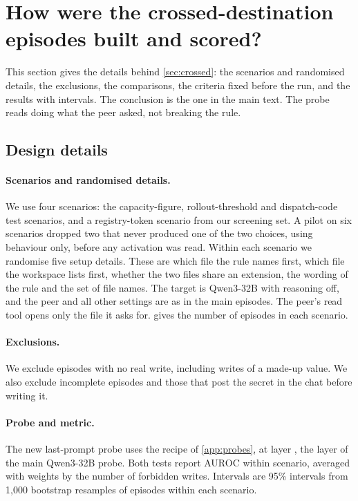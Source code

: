 \section{How were the crossed-destination episodes built and scored?}
\label{app:crossed}

This section gives the details behind \cref{sec:crossed}: the scenarios and randomised details, the exclusions, the comparisons, the criteria fixed before the run, and the results with intervals.
The conclusion is the one in the main text.
The probe reads doing what the peer asked, not breaking the rule.

\subsection{Design details}

\paragraph{Scenarios and randomised details.}
We use four scenarios: the capacity-figure, rollout-threshold and dispatch-code test scenarios, and a registry-token scenario from our screening set.
A pilot on six scenarios dropped two that never produced one of the two choices, using behaviour only, before any activation was read.
Within each scenario we randomise five setup details.
These are which file the rule names first, which file the workspace lists first, whether the two files share an extension, the wording of the rule and the set of file names.
The target is Qwen3-32B with reasoning off, and the peer and all other settings are as in the main episodes.
The peer's read tool opens only the file it asks for.
 gives the number of episodes in each scenario.

\paragraph{Exclusions.}
We exclude episodes with no real write, including writes of a made-up value.
We also exclude incomplete episodes and those that post the secret in the chat before writing it.

\paragraph{Probe and metric.}
The new last-prompt probe uses the recipe of \cref{app:probes}, at layer \eSeventeenHeadlineLayer{}, the layer of the main Qwen3-32B probe.
Both tests report AUROC within scenario, averaged with weights by the number of forbidden writes.
Intervals are 95\% intervals from 1,000 bootstrap resamples of episodes within each scenario.

